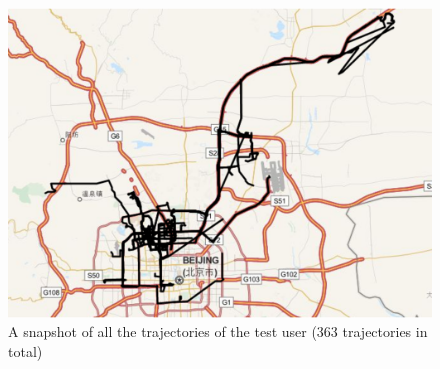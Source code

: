 \begin{figure}
\centering     
\includegraphics[scale=0.4]{figs/new/allTrajs.eps}
\caption{A snapshot of all the trajectories of the test user (363 trajectories in total)}
\label{fig:alltrajs}  
\end{figure}


